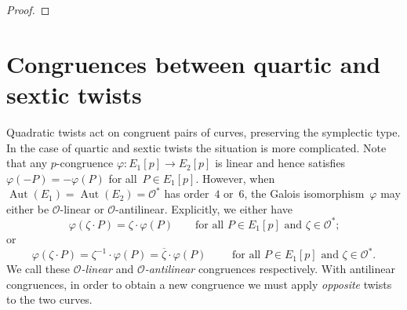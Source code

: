 \documentclass[12pt, reqno]{amsart}
\newcommand{\calO}{\mathcal{O}}
\DeclareMathOperator{\Aut}{Aut}
\numberwithin{equation}{section}
\theoremstyle{definition}
\theoremstyle{remark}
\newcommand{\jc}[1]{{\color{darkgreen} \textsf{[JC: #1]}}}
\begin{document}
\begin{proof}
\begin{comment}Suppose $M = K(\root 3 \of{u})$ or $M = K(\sqrt{u}) \neq
K(\sqrt{-3})$.  Arguing as in case (ii) with $E/M$ gives the desired
conclusion.

\jc{What if $M = K(\root 3 \of{u})$ and $[F:K]=6$, then $[F:M]=2$ and
  we lose absolute irreducibility over~$M$? }

We are left with the case $M = K(\sqrt{-3})$. This means that $u = -3
s^2$ with $s \in K$ and so $u = -27 s_0^2$ with $s_0 \in K$. Thus
applying to~$E'$ the $3$-isogeny from Remark~\ref{R:3-isog} reduces to
the case $u = s_0^2$. The result again follows from (i).
\end{comment}

\end{proof}

\section{Congruences between quartic and sextic twists}\label{S:cong-twist-46}

Quadratic twists act on congruent pairs of curves, preserving the
symplectic type.  In the case of quartic and sextic twists the
situation is more complicated.  Note that any $p$-congruence
$\varphi:E_1[p]\to E_2[p]$ is linear and hence satisfies
$\varphi(-P)=-\varphi(P)$ for all~$P\in E_1[p]$.  However, when
$\Aut(E_1)=\Aut(E_2)=\calO^*$ has order~$4$ or~$6$, the Galois
isomorphism~$\varphi$ may either be $\calO$-linear or
$\calO$-antilinear.  Explicitly, we either have
\begin{equation}\label{E:forward-congruence}
\varphi(\zeta\cdot P) = \zeta\cdot\varphi(P)
\qquad\text{for all~$P\in  E_1[p]$ and~$\zeta\in\calO^*$;}
\end{equation}
or
\begin{equation}\label{E:backward-congruence}
\varphi(\zeta\cdot P) = \zeta^{-1}\cdot\varphi(P) = \overline\zeta\cdot\varphi(P)
\qquad\text{ for all~$P\in E_1[p]$ and~$\zeta\in\calO^*$.}
\end{equation}
We call these \emph{$\calO$-linear} and \emph{$\calO$-antilinear}
congruences respectively.  With antilinear congruences, in order to
obtain a new congruence we must apply \emph{opposite} twists to the
two curves.
\end{document}
